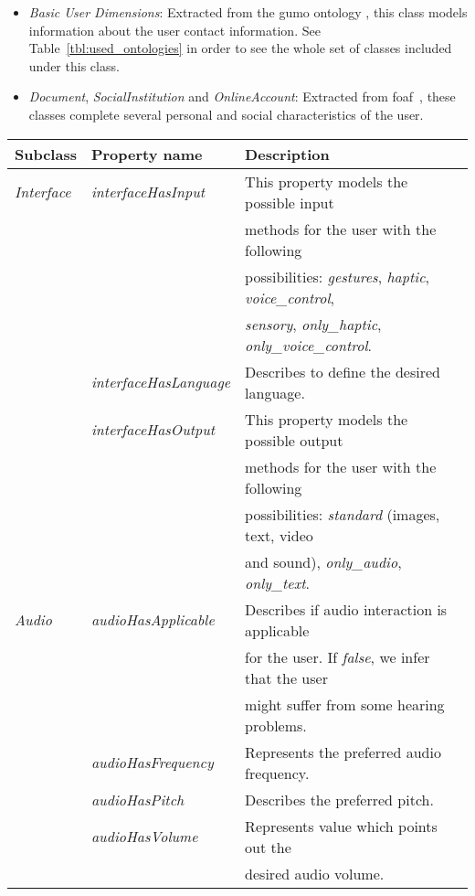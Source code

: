 \begin{itemize}
  \item \textit{Basic User Dimensions}: Extracted from the \ac{gumo} ontology
  \citep{heckmann_gumogeneral_2005}, this class models information about the user
  contact information. See Table~\ref{tbl:used_ontologies} in order to see the
  whole set of classes included under this class.
  
  \item \textit{Document}, \textit{SocialInstitution} and \textit{OnlineAccount}:
  Extracted from \ac{foaf}~\citep{foaf}, these classes complete several personal 
  and social characteristics of the user.
\end{itemize}



\begin{center}
\footnotesize
\begin{longtable}{l l l}
  
  \label{tbl:user_characteristics_ontology} \\
  \hline 
  \textbf{Subclass} 	& \textbf{Property name} 	& \textbf{Description}							\\
  \hline
  \textit{Interface}	& \textit{interfaceHasInput}	& This property models the possible input				\\
			& 				& methods for the user with the following		 		\\
			& 				& possibilities: \textit{gestures}, \textit{haptic}, \textit{voice\_control},\\
			&				& \textit{sensory}, \textit{only\_haptic}, \textit{only\_voice\_control}.\\
			& \textit{interfaceHasLanguage}	& Describes to define the desired language. 				\\
			& \textit{interfaceHasOutput}	& This property models the possible output  				\\
			& 				& methods for the user with the following 				\\
			& 				& possibilities: \textit{standard} (images, text, video  		\\
			&				& and sound), \textit{only\_audio}, \textit{only\_text}. 		\\
  
  \textit{Audio}	& \textit{audioHasApplicable}	& Describes if audio interaction is applicable				\\ 
			& 				& for the user. If \textit{false}, we infer that the user		\\
  			& 				&  might suffer from some hearing problems.				\\
  			& \textit{audioHasFrequency}	& Represents the preferred audio frequency. 				\\
  			& \textit{audioHasPitch}	& Describes the preferred pitch. 					\\
  			& \textit{audioHasVolume}	& Represents value which points out the 				\\
  			&				& desired audio volume.							\\
  			

\end{longtable}
\end{center}
